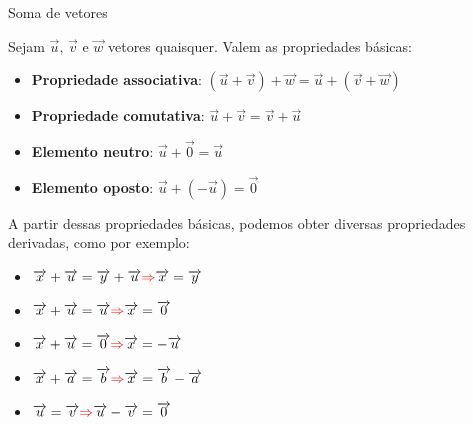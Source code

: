 \begin{frame}{Soma de vetores}

    Sejam \(\vec{u}\), \(\vec{v}\) e \(\vec{w}\) vetores quaisquer. Valem as propriedades básicas:

    \begin{itemize}
        \item \textbf{Propriedade associativa}:
            \((\vec{u}+\vec{v})+\vec{w}=\vec{u}+(\vec{v}+\vec{w})\)
        \item \textbf{Propriedade comutativa}: \(\vec{u}+\vec{v}=\vec{v}+\vec{u}\)
        \item \textbf{Elemento neutro}: \(\vec{u}+\vec{0}=\vec{u}\)
        \item \textbf{Elemento oposto}: \(\vec{u}+(-\vec{u})=\vec{0}\)
    \end{itemize}
    \pause
    A partir dessas propriedades básicas, podemos obter diversas propriedades derivadas, como por exemplo:
    \begin{itemize}
        \item \(\vec{x}+\vec{u}=\vec{y}+\vec{u} \textcolor{red}{\Rightarrow} \vec{x}=\vec{y}\)
        \item \(\vec{x}+\vec{u}=\vec{u} \textcolor{red}{\Rightarrow} \vec{x}=\vec{0}\)
        \item \(\vec{x}+\vec{u}=\vec{0} \textcolor{red}{\Rightarrow} \vec{x}=-\vec{u}\)
        \item \(\vec{x}+\vec{a}=\vec{b} \textcolor{red}{\Rightarrow} \vec{x}=\vec{b}-\vec{a}\)
        \item \(\vec{u}=\vec{v} \textcolor{red}{\Rightarrow} \vec{u}-\vec{v}=\vec{0}\)
    \end{itemize}
\end{frame}


